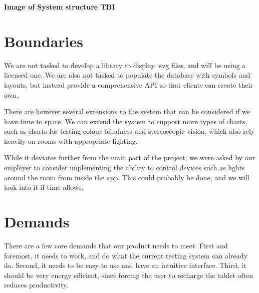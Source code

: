 \documentclass[12pt,a4paper,notitlepage]{report}
\begin{document}
\textbf{Image of System structure TBI}



\section{Boundaries}
We are not tasked to develop a library to display .svg files, and will be using a licensed one. We are also not tasked to populate the database with symbols and layouts, but instead provide a comprehensive API so that clients can create their own.


There are however several extensions to the system that can be considered if we have time to spare. We can extend the system to support more types of charts, such as charts for testing colour blindness and stereoscopic vision, which also rely heavily on rooms with appropriate lighting.

While it deviates further from the main part of the project, we were asked by our employer to consider implementing the ability to control devices such as lights around the room from inside the app. This could probably be done, and we will look into it if time allows.

\section{Demands} %
There are a few core demands that our product needs to meet. First and foremost, it needs to work, and do what the current testing system can already do. Second, it needs to be easy to use and have an intuitive interface. Third, it should be very energy efficient, since forcing the user to recharge the tablet often reduces productivity. 
\end{document}
